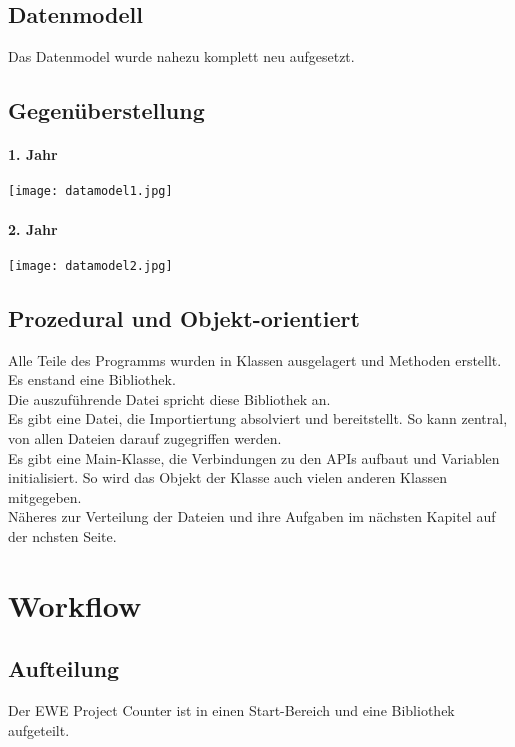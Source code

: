 \documentclass[a4paper,12pt]{report}
\begin{document}
	\section{Datenmodell}
		Das Datenmodel wurde nahezu komplett neu aufgesetzt.
		
		\section{Gegenüberstellung}
		
		\subsubsection{1. Jahr}
		\texttt{[image: datamodel1.jpg]}
		
		\subsubsection{2. Jahr}
		\texttt{[image: datamodel2.jpg]}
	
	\section{Prozedural und Objekt-orientiert}
	Alle Teile des Programms wurden in Klassen ausgelagert und Methoden erstellt. Es enstand eine Bibliothek.\\
	Die auszuführende Datei spricht diese Bibliothek an.\\
	Es gibt eine Datei, die Importiertung absolviert und bereitstellt. So kann zentral, von allen Dateien darauf zugegriffen werden.\\
	Es gibt eine Main-Klasse, die Verbindungen zu den APIs aufbaut und Variablen initialisiert. So wird das Objekt der Klasse auch vielen anderen Klassen mitgegeben.\\
	Näheres zur Verteilung der Dateien und ihre Aufgaben im nächsten Kapitel auf der nchsten Seite.
	
\chapter{Workflow}
	\section{Aufteilung}
	Der EWE Project Counter ist in einen Start-Bereich und eine Bibliothek aufgeteilt.\\\\
	
\end{document}
